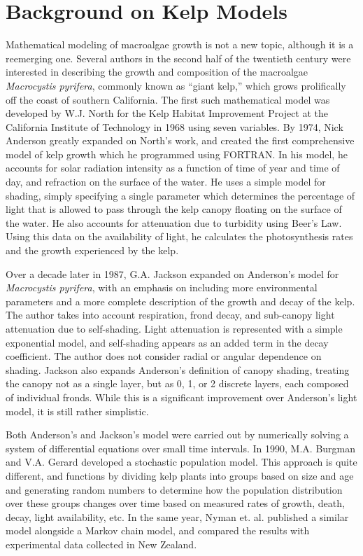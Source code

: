 \section{Background on Kelp Models}

Mathematical modeling of macroalgae growth is not a new topic, although it is a reemerging one.
Several authors in the second half of the twentieth century were interested in describing the growth and composition of the macroalgae \textit{Macrocystis pyrifera}, commonly known as ``giant kelp,'' which grows prolifically off the coast of southern California.
The first such mathematical model was developed by W.J. North for the Kelp Habitat Improvement Project at the California Institute of Technology in 1968 using seven variables.
By 1974, Nick Anderson greatly expanded on North's work, and created the first comprehensive model of kelp growth which he programmed using FORTRAN\cite{anderson_mathematical_1974}.
In his model, he accounts for solar radiation intensity as a function of time of year and time of day, and refraction on the surface of the water.
He uses a simple model for shading, simply specifying a single parameter which determines the percentage of light that is allowed to pass through the kelp canopy floating on the surface of the water.
He also accounts for attenuation due to turbidity using Beer's Law.
Using this data on the availability of light, he calculates the photosynthesis rates and the growth experienced by the kelp.

Over a decade later in 1987, G.A.
Jackson expanded on Anderson's model for \textit{Macrocystis pyrifera}, with an emphasis on including more environmental parameters and a more complete description of the growth and decay of the kelp\cite{jackson_modelling_1987}. 
The author takes into account respiration, frond decay, and sub-canopy light attenuation due to self-shading.
Light attenuation is represented with a simple exponential model, and self-shading appears as an added term in the decay coefficient.
The author does not consider radial or angular dependence on shading. %
Jackson also expands Anderson's definition of canopy shading, treating the canopy not as a single layer, but as 0, 1, or 2 discrete layers, each composed of individual fronds.
While this is a significant improvement over Anderson's light model, it is still rather simplistic.

Both Anderson's and Jackson's model were carried out by numerically solving a system of differential equations over small time intervals.
In 1990, M.A. Burgman and V.A. Gerard developed a stochastic population model\cite{burgman_stage-structured_1990}.
This approach is quite different, and functions by dividing kelp plants into groups based on size and age and generating random numbers to determine how the population distribution over these groups changes over time based on measured rates of growth, death, decay, light availability, etc.
In the same year, Nyman et. al. published a similar model alongside a Markov chain model, and compared the results with experimental data collected in New Zealand\cite{nyman_macrocystis_1990}.

